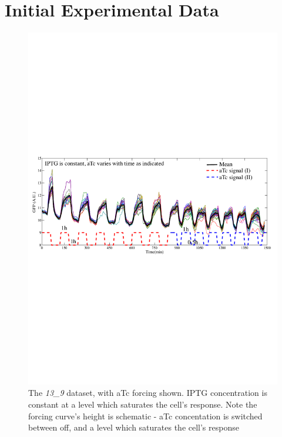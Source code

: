 \documentclass[10pt,journal]{./IEEE_latex_class/IEEEtran}
\begin{document}
\clearpage
\onecolumn

\appendices
\renewcommand\thefigure{\thesection.\arabic{figure}}  


\section{Initial Experimental Data}
\label{Initial Experimental Data}
\setcounter{figure}{0}    

\begin{figure}[h]
\centering
\includegraphics[trim = 0 310 0 300 , scale = 0.5, clip = true]{13_9}
\caption{The \textit{13\_9} dataset, with aTc forcing shown. IPTG concentration is constant at a level which saturates the cell's response. Note the forcing curve's height is schematic - aTc concentation is switched between off, and a level which saturates the cell's response}
\label{}
\end{figure}
\end{document}
